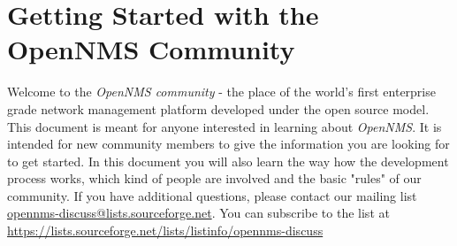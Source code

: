 \section{Getting Started with the OpenNMS Community}
Welcome to the \emph{OpenNMS community} - the place of the world's first enterprise grade network management platform developed under the open source model. This document is meant for anyone interested in learning about \emph{OpenNMS}. It is intended for new community members to give the information you are looking for to get started. In this document you will also learn the way how the development process works, which kind of people are involved and the basic "rules" of our community. If you have additional questions, please contact our mailing list \url{opennms-discuss@lists.sourceforge.net}. You can subscribe to the list at \url{https://lists.sourceforge.net/lists/listinfo/opennms-discuss}
